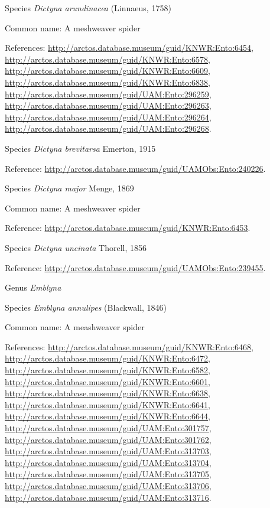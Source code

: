 \documentclass[9pt, article]{memoir}
\begin{document}
\begin{multicols}{2}
\vspace{6pt}\noindent\hspace{36pt}Species \textit{Dictyna arundinacea} (Linnaeus, 1758)


Common name: A meshweaver spider

References: 
\url{http://arctos.database.museum/guid/KNWR:Ento:6454}, 
\url{http://arctos.database.museum/guid/KNWR:Ento:6578}, 
\url{http://arctos.database.museum/guid/KNWR:Ento:6609}, 
\url{http://arctos.database.museum/guid/KNWR:Ento:6838}, 
\url{http://arctos.database.museum/guid/UAM:Ento:296259}, 
\url{http://arctos.database.museum/guid/UAM:Ento:296263}, 
\url{http://arctos.database.museum/guid/UAM:Ento:296264}, 
\url{http://arctos.database.museum/guid/UAM:Ento:296268}.

\vspace{6pt}\noindent\hspace{36pt}Species \textit{Dictyna brevitarsa} Emerton, 1915


Reference: 
\url{http://arctos.database.museum/guid/UAMObs:Ento:240226}.

\vspace{6pt}\noindent\hspace{36pt}Species \textit{Dictyna major} Menge, 1869


Common name: A meshweaver spider

Reference: 
\url{http://arctos.database.museum/guid/KNWR:Ento:6453}.

\vspace{6pt}\noindent\hspace{36pt}Species \textit{Dictyna uncinata} Thorell, 1856


Reference: 
\url{http://arctos.database.museum/guid/UAMObs:Ento:239455}.

\vspace{6pt}\noindent\hspace{30pt}Genus \textit{Emblyna}


\vspace{6pt}\noindent\hspace{36pt}Species \textit{Emblyna annulipes} (Blackwall, 1846)


Common name: A meashweaver spider

References: 
\url{http://arctos.database.museum/guid/KNWR:Ento:6468}, 
\url{http://arctos.database.museum/guid/KNWR:Ento:6472}, 
\url{http://arctos.database.museum/guid/KNWR:Ento:6582}, 
\url{http://arctos.database.museum/guid/KNWR:Ento:6601}, 
\url{http://arctos.database.museum/guid/KNWR:Ento:6638}, 
\url{http://arctos.database.museum/guid/KNWR:Ento:6641}, 
\url{http://arctos.database.museum/guid/KNWR:Ento:6644}, 
\url{http://arctos.database.museum/guid/UAM:Ento:301757}, 
\url{http://arctos.database.museum/guid/UAM:Ento:301762}, 
\url{http://arctos.database.museum/guid/UAM:Ento:313703}, 
\url{http://arctos.database.museum/guid/UAM:Ento:313704}, 
\url{http://arctos.database.museum/guid/UAM:Ento:313705}, 
\url{http://arctos.database.museum/guid/UAM:Ento:313706}, 
\url{http://arctos.database.museum/guid/UAM:Ento:313716}.


\end{multicols}
\end{document}
